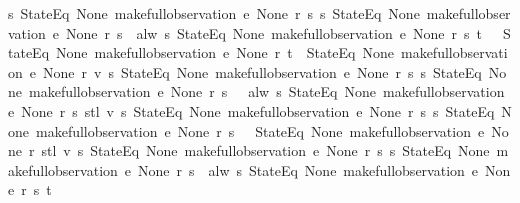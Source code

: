 \begin{isabellebody}
{\isacharparenleft}{\isasymlambda}s{\isachardot}\ StateEq\ None\ {\isacharparenleft}make{\isacharunderscore}full{\isacharunderscore}observation\ e\ None\ r\ s{\isacharparenright}{\isacharparenright}\ {\isacharparenleft}{\isasymlambda}s{\isachardot}\ StateEq\ None\ {\isacharparenleft}make{\isacharunderscore}full{\isacharunderscore}observation\ e\ None\ r\ s{\isacharparenright}{\isacharparenright}{\isacharparenright}{\isacharparenright}{\isacharparenright}\ {\isasymor}\ alw\ {\isacharparenleft}{\isasymlambda}s{\isachardot}\ StateEq\ None\ {\isacharparenleft}make{\isacharunderscore}full{\isacharunderscore}observation\ e\ None\ r\ s{\isacharparenright}{\isacharparenright}\ t{\isacharparenright}\ {\isacharequal}\ {\isacharparenleft}{\isasymnot}\ StateEq\ None\ {\isacharparenleft}make{\isacharunderscore}full{\isacharunderscore}observation\ e\ None\ r\ t{\isacharparenright}\ {\isasymor}\ StateEq\ None\ {\isacharparenleft}make{\isacharunderscore}full{\isacharunderscore}observation\ e\ None\ r\ {\isacharparenleft}v{}{\isacharunderscore}{}\ {\isacharparenleft}{\isasymlambda}s{\isachardot}\ StateEq\ None\ {\isacharparenleft}make{\isacharunderscore}full{\isacharunderscore}observation\ e\ None\ r\ s{\isacharparenright}{\isacharparenright}\ {\isacharparenleft}{\isasymlambda}s{\isachardot}\ StateEq\ None\ {\isacharparenleft}make{\isacharunderscore}full{\isacharunderscore}observation\ e\ None\ r\ s{\isacharparenright}{\isacharparenright}{\isacharparenright}{\isacharparenright}\ {\isasymand}\ {\isasymnot}\ alw\ {\isacharparenleft}{\isasymlambda}s{\isachardot}\ StateEq\ None\ {\isacharparenleft}make{\isacharunderscore}full{\isacharunderscore}observation\ e\ None\ r\ s{\isacharparenright}{\isacharparenright}\ {\isacharparenleft}stl\ {\isacharparenleft}v{}{\isacharunderscore}{}\ {\isacharparenleft}{\isasymlambda}s{\isachardot}\ StateEq\ None\ {\isacharparenleft}make{\isacharunderscore}full{\isacharunderscore}observation\ e\ None\ r\ s{\isacharparenright}{\isacharparenright}\ {\isacharparenleft}{\isasymlambda}s{\isachardot}\ StateEq\ None\ {\isacharparenleft}make{\isacharunderscore}full{\isacharunderscore}observation\ e\ None\ r\ s{\isacharparenright}{\isacharparenright}{\isacharparenright}{\isacharparenright}\ {\isasymand}\ {\isasymnot}\ StateEq\ None\ {\isacharparenleft}make{\isacharunderscore}full{\isacharunderscore}observation\ e\ None\ r\ {\isacharparenleft}stl\ {\isacharparenleft}v{}{\isacharunderscore}{}\ {\isacharparenleft}{\isasymlambda}s{\isachardot}\ StateEq\ None\ {\isacharparenleft}make{\isacharunderscore}full{\isacharunderscore}observation\ e\ None\ r\ s{\isacharparenright}{\isacharparenright}\ {\isacharparenleft}{\isasymlambda}s{\isachardot}\ StateEq\ None\ {\isacharparenleft}make{\isacharunderscore}full{\isacharunderscore}observation\ e\ None\ r\ s{\isacharparenright}{\isacharparenright}{\isacharparenright}{\isacharparenright}{\isacharparenright}\ {\isasymor}\ alw\ {\isacharparenleft}{\isasymlambda}s{\isachardot}\ StateEq\ None\ {\isacharparenleft}make{\isacharunderscore}full{\isacharunderscore}observation\ e\ None\ r\ s{\isacharparenright}{\isacharparenright}\ t{\isacharparenright}{\isachardoublequoteclose}\isanewline

\end{isabellebody}
